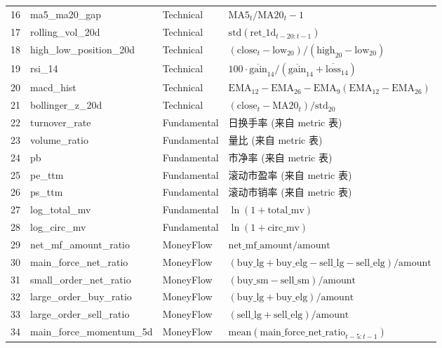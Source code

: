 {\begin{longtable}{@{}rllp{5.5cm}@{}}
16 & ma5\_ma20\_gap           & Technical & $\text{MA5}_t / \text{MA20}_t - 1$ \\
17 & rolling\_vol\_20d        & Technical & $\text{std}(\text{ret\_1d}_{t-20:t-1})$ \\
18 & high\_low\_position\_20d  & Technical & $(\text{close}_t - \text{low}_{20}) / (\text{high}_{20} - \text{low}_{20})$ \\
19 & rsi\_14                 & Technical & $100 \cdot \overline{\text{gain}}_{14} / (\overline{\text{gain}}_{14} + \overline{\text{loss}}_{14})$ \\
20 & macd\_hist              & Technical & $\text{EMA}_{12} - \text{EMA}_{26} - \text{EMA}_9(\text{EMA}_{12} - \text{EMA}_{26})$ \\
21 & bollinger\_z\_20d        & Technical & $(\text{close}_t - \text{MA20}_t) / \text{std}_{20}$ \\
\midrule
22 & turnover\_rate          & Fundamental & 日换手率 (来自 metric 表) \\
23 & volume\_ratio           & Fundamental & 量比 (来自 metric 表) \\
24 & pb                     & Fundamental & 市净率 (来自 metric 表) \\
25 & pe\_ttm                & Fundamental & 滚动市盈率 (来自 metric 表) \\
26 & ps\_ttm                & Fundamental & 滚动市销率 (来自 metric 表) \\
27 & log\_total\_mv          & Fundamental & $\ln(1 + \text{total\_mv})$ \\
28 & log\_circ\_mv           & Fundamental & $\ln(1 + \text{circ\_mv})$ \\
\midrule
29 & net\_mf\_amount\_ratio   & MoneyFlow & $\text{net\_mf\_amount} / \text{amount}$ \\
30 & main\_force\_net\_ratio  & MoneyFlow & $(\text{buy\_lg} + \text{buy\_elg} - \text{sell\_lg} - \text{sell\_elg}) / \text{amount}$ \\
31 & small\_order\_net\_ratio & MoneyFlow & $(\text{buy\_sm} - \text{sell\_sm}) / \text{amount}$ \\
32 & large\_order\_buy\_ratio & MoneyFlow & $(\text{buy\_lg} + \text{buy\_elg}) / \text{amount}$ \\
33 & large\_order\_sell\_ratio& MoneyFlow & $(\text{sell\_lg} + \text{sell\_elg}) / \text{amount}$ \\
34 & main\_force\_momentum\_5d& MoneyFlow & $\text{mean}(\text{main\_force\_net\_ratio}_{t-5:t-1})$ \\

\end{longtable}}
